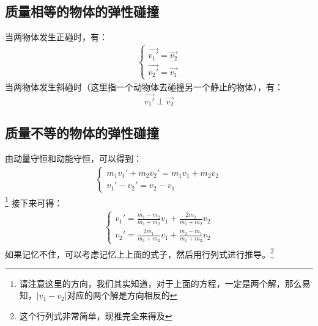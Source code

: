 \documentclass{ctexart}
\begin{document}
\subsection{质量相等的物体的弹性碰撞}
当两物体发生正碰时，有：
\begin{align*}
    \begin{cases}
        \vec{v_1'} = \vec{v_2} \\
        \vec{v_2'} = \vec{v_1}
    \end{cases}
\end{align*}
当两物体发生斜碰时（这里指一个动物体去碰撞另一个静止的物体），有：
$$
    \vec{v_1'} \perp \vec{v_2}
$$
\subsection{质量不等的物体的弹性碰撞}
由动量守恒和动能守恒，可以得到：
\begin{align*}
    \begin{cases}
        m_1v_1' + m_2v_2' = m_1v_1 + m_2v_2 \\
        v_1' - v_2' = v_2 - v_1
    \end{cases}
\end{align*}
\footnote{请注意这里的方向，我们其实知道，对于上面的方程，一定是两个解，那么易知，$ |v_1 - v_2| $对应的两个解是方向相反的}
接下来可得：
\begin{align*}
    \begin{cases}
        v_1' = \frac{m_1 - m_2}{m_1 + m_2}v_1 + \frac{2m_2}{m_1 + m_2}v_2 \\
        v_2' = \frac{2m_1}{m_1 + m_2}v_1 + \frac{m_2 - m_1}{m_1 + m_2}v_2
    \end{cases}
\end{align*}
如果记忆不住，可以考虑记忆上上面的式子，然后用行列式进行推导。\footnote{这个行列式非常简单，现推完全来得及}
\end{document}
